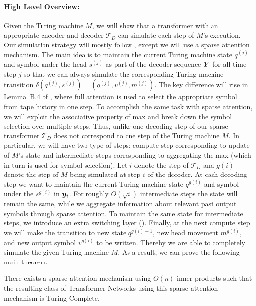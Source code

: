 \paragraph{High Level Overview:}
Given the Turing machine $M$, we will show that a transformer with an appropriate encoder and decoder $\mathcal{T}_D$ can simulate each step of $M$'s execution.
Our simulation strategy will mostly follow \citet{Perez19}, except we will use a sparse attention mechanism.
The main idea is to maintain the current Turing machine state $q^{(j)}$ and symbol under the head $s^{(j)}$ as part of the decoder sequence ${\bm{Y}}$ for all time step $j$ so that we can always simulate the corresponding Turing machine transition $\delta(q^{(j)}, s^{(j)}) = (q^{(j)}, v^{(j)}, m^{(j)})$.
The key difference will rise in Lemma~B.4 of \citet{Perez19}, where full attention is used to select the appropriate symbol from tape history in one step.
To accomplish the same task with sparse attention, we will exploit the associative property of max and break down the symbol selection over multiple steps.
Thus, unlike \citet{Perez19} one decoding step of our sparse transformer $\mathcal{T}_D$ does not correspond to one step of the Turing machine $M$.
In particular, we will have two type of steps: compute step corresponding to update of $M$'s state and intermediate steps corresponding to aggregating the max (which in turn is used for symbol selection).
Let $i$ denote the step of $\mathcal{T}_D$ and $g(i)$ denote the step of $M$ being simulated at step $i$ of the decoder.
At each decoding step we want to maintain the current Turing machine state $q^{g(i)}$ and symbol under the $s^{g(i)}$ in ${\bm{y}}_i$.
For roughly $O(\sqrt{i})$ intermediate steps the state will remain the same, while we aggregate information about relevant past output symbols through sparse attention.
To maintain the same state for intermediate steps, we introduce an extra switching layer ().
Finally, at the next compute step we will make the transition to new state $q^{g(i)+1}$, new head movement $m^{g(i)}$, and new output symbol $v^{g(i)}$ to be written. 
Thereby we are able to completely simulate the given Turing machine $M$.
%
As a result, we can prove the following main theorem:
\begin{theorem}
There exists a sparse attention mechanism using $O(n)$ inner products such that the resulting class of Transformer Networks using this sparse attention mechanism is Turing Complete. 
\end{theorem}


